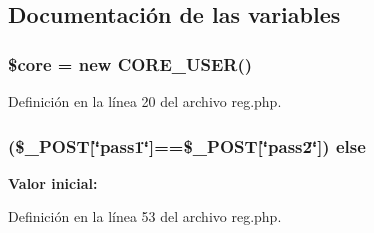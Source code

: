 \subsection{Documentación de las variables}
\hypertarget{reg_8php_aa432de3bacb7ced3632fa0ee0269ada3}{
\subsubsection[{\$core}]{\setlength{\rightskip}{0pt plus 5cm}\$core = new C\-O\-R\-E\-\_\-\-U\-S\-E\-R()}}\label{reg_8php_aa432de3bacb7ced3632fa0ee0269ada3}


Definición en la línea 20 del archivo reg.\-php.

\hypertarget{reg_8php_a8f8bfeac9b28f3b8ca1912c0eb479478}{
\subsubsection[{else}]{ (\$\-\_\-\-P\-O\-S\-T\mbox{[}\char`\"{}pass1\char`\"{}\mbox{]}==\$\-\_\-\-P\-O\-S\-T\mbox{[}\char`\"{}pass2\char`\"{}\mbox{]}) else}}\label{reg_8php_a8f8bfeac9b28f3b8ca1912c0eb479478}
{\bfseries Valor inicial\-:}


Definición en la línea 53 del archivo reg.\-php.


